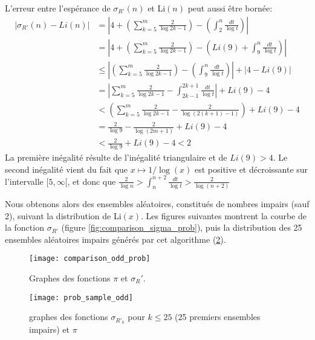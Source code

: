 \documentclass[../main.tex]{report}
\begin{document}
L'erreur entre l'espérance de $\sigma_{R'}(n)$ et Li$(n)$ peut aussi être bornée:
\[ \begin{aligned}
\left| \sigma_{R'}(n) - Li(n) \right|
&= \left| 4 + \left(\sum_{k=5}^m \frac{2}{\log 2k-1}\right)
		- \left(\int_2^n \frac{dt}{\log t} \right) \right| \\
&= \left| 4 + \left(\sum_{k=5}^m \frac{2}{\log 2k-1}\right)
		- \left(Li(9) + \int_9^n \frac{dt}{\log t} \right) \right| \\
&\leq \left| \left(\sum_{k=5}^m \frac{2}{\log 2k-1}\right)
		- \left(\int_9^n \frac{dt}{\log t} \right) \right| + \left| 4 - Li(9)\right| \\
&= \left| \sum_{k=5}^m \frac{2}{\log 2k - 1} - 
		\int_{2k-1}^{2k+1} \frac{dt}{\log t} \right| + Li(9) - 4 \\ 
&< \left(\sum_{k=5}^m \frac{2}{\log 2k-1} - \frac{2}{\log{(2(k+1)-1)}}\right)
		+ Li(9) - 4 \\
&= \frac{2}{\log 9} - \frac{2}{\log (2m + 1)} + Li(9) - 4 \\
&< \frac{2}{\log 9} + Li(9) - 4	< 2		
\end{aligned} \]
La première inégalité résulte de l'inégalité triangulaire et de $Li(9) > 4$. Le second inégalité vient du fait que $x \mapsto 1/\log(x)$ est positive et décroissante sur l'intervalle $[5,\infty[$, 
et donc que $\frac{2}{\log n} > \int_n^{n+2}\frac{dt}{\log t} > \frac{2}{\log (n+2)}$

Nous obtenons alors des ensembles aléatoires, constitués de nombres impairs (sauf 2), suivant la distribution de Li$(x)$. 
Les figures suivantes montrent la courbe de la fonction $\sigma_{R'}$ (figure \ref{fig:comparison_sigma_prob}), puis la distribution des 25 ensembles aléatoires impairs générés par cet algorithme (\ref{fig:prob_sample_odd}).

\begin{figure}[H]
\centering
\texttt{[image: comparison\_odd\_prob]}
\caption{Graphes des fonctions $\pi$ et $\sigma_R'$.}
\label{fig:comparison_odd_prob}
\end{figure}

\begin{figure}[H]
	\centering
	\texttt{[image: prob\_sample\_odd]}
	\caption{graphes des fonctions $\sigma_{R'_k}$ pour $k \leq 25$ (25 premiers ensembles impairs) et $\pi$}
	\label{fig:prob_sample_odd}
\end{figure}
\end{document}
